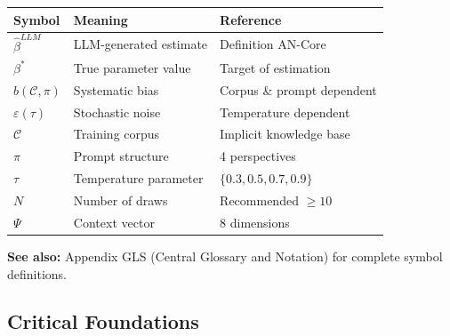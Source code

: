 \begin{center}
\begin{tabular}{@{}lll@{}}
\toprule
\textbf{Symbol} & \textbf{Meaning} & \textbf{Reference} \\
\midrule
$\hat{\beta}^{LLM}$ & LLM-generated estimate & Definition AN-Core \\
$\beta^*$ & True parameter value & Target of estimation \\
$b(\mathcal{C}, \pi)$ & Systematic bias & Corpus \& prompt dependent \\
$\varepsilon(\tau)$ & Stochastic noise & Temperature dependent \\
$\mathcal{C}$ & Training corpus & Implicit knowledge base \\
$\pi$ & Prompt structure & 4 perspectives \\
$\tau$ & Temperature parameter & $\{0.3, 0.5, 0.7, 0.9\}$ \\
$N$ & Number of draws & Recommended $\geq 10$ \\
$\Psi$ & Context vector & 8 dimensions \\
\bottomrule
\end{tabular}
\end{center}

\textbf{See also:} Appendix GLS (Central Glossary and Notation) for complete symbol definitions.


\subsection{Critical Foundations}
\label{sec:AN-foundations}

